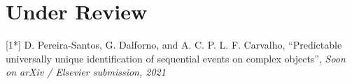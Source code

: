    \section{Under Review}
\vspace{0.5cm}

[1*] D. Pereira-Santos, G. Dalforno, and A. C. P. L. F. Carvalho, “Predictable universally unique identification of sequential events on complex objects”, \textit{Soon on arXiv / Elsevier submission, 2021}

\nocite{*}
\printbibliography[title=Publications]

